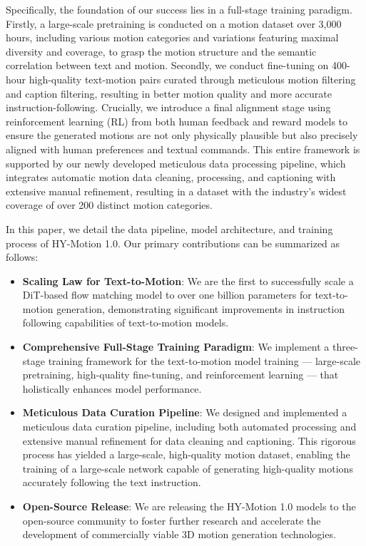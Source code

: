 Specifically, the foundation of our success lies in a full-stage training paradigm. 
Firstly, a large-scale pretraining is conducted on a motion dataset over 3,000 hours, including various motion categories and variations featuring maximal diversity and coverage, to grasp the motion structure and the semantic correlation between text and motion.
Secondly, we conduct fine-tuning on 400-hour high-quality text-motion pairs curated through meticulous motion filtering and caption filtering, resulting in better motion quality and more accurate instruction-following.
Crucially, we introduce a final alignment stage using reinforcement learning (RL) from both human feedback and reward models to ensure the generated motions are not only physically plausible but also precisely aligned with human preferences and textual commands. 
This entire framework is supported by our newly developed meticulous data processing pipeline, which integrates automatic motion data cleaning, processing, and captioning with extensive manual refinement, resulting in a dataset with the industry's widest coverage of over 200 distinct motion categories.

In this paper, we detail the data pipeline, model architecture, and training process of HY-Motion 1.0. Our primary contributions can be summarized as follows:

\begin{itemize}
    \item \textbf{Scaling Law for Text-to-Motion}: We are the first to successfully scale a DiT-based flow matching model to over one billion parameters for text-to-motion generation, demonstrating significant improvements in instruction following capabilities of text-to-motion models.
    \item \textbf{Comprehensive Full-Stage Training Paradigm}: We implement a three-stage training framework for the text-to-motion model training — large-scale pretraining, high-quality fine-tuning, and reinforcement learning — that holistically enhances model performance.
    \item \textbf{Meticulous Data Curation Pipeline}: We designed and implemented a meticulous data curation pipeline, including both automated processing and extensive manual refinement for data cleaning and captioning. This rigorous process has yielded a large-scale, high-quality motion dataset, 
    enabling the training of a large-scale network capable of generating high-quality motions accurately following the text instruction.
    \item \textbf{Open-Source Release}: We are releasing the HY-Motion 1.0 models to the open-source community to foster further research and accelerate the development of commercially viable 3D motion generation technologies.
\end{itemize}







